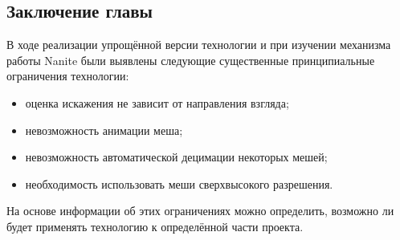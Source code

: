 \subsection*{Заключение главы}
В ходе реализации упрощённой версии технологии и при изучении механизма работы Nanite были выявлены следующие существенные принципиальные ограничения технологии:
\begin{itemize}
    \item оценка искажения не зависит от направления взгляда;
    \item невозможность анимации меша;
    \item невозможность автоматической децимации некоторых мешей;
    \item необходимость использовать меши сверхвысокого разрешения.
\end{itemize}

На основе информации об этих ограничениях можно определить, возможно ли будет применять технологию к определённой части проекта.
